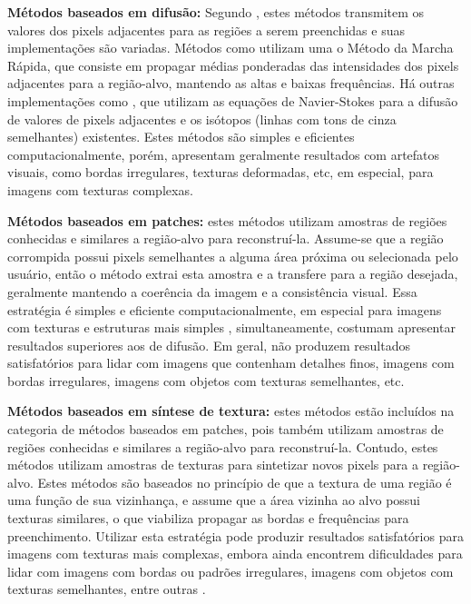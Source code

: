 \begin{list}{}{}

  \item \textbf{Métodos baseados em difusão:} \label{diffusion}
Segundo \cite{black2020evaluation}, estes métodos transmitem os valores dos pixels adjacentes para as regiões a serem preenchidas e suas implementações são variadas. Métodos como \cite{Telea2004} utilizam uma o Método da Marcha Rápida, que consiste em propagar médias ponderadas das intensidades dos pixels adjacentes para a região-alvo, mantendo as altas e baixas frequências. Há outras implementações como \cite{Bertalmio2001navier}, que utilizam as equações de Navier-Stokes para a difusão de valores de pixels adjacentes e os isótopos (linhas com tons de cinza semelhantes) existentes. Estes métodos são simples e eficientes computacionalmente, porém, apresentam geralmente resultados com artefatos visuais, como bordas irregulares, texturas deformadas, etc, em especial, para imagens com texturas complexas.

  \item \textbf{Métodos baseados em patches:} \label{sample}
estes métodos utilizam amostras de regiões conhecidas e similares a região-alvo para reconstruí-la. Assume-se que a região corrompida possui pixels semelhantes a alguma área próxima ou selecionada pelo usuário, então o método extrai esta amostra e a transfere para a região desejada, geralmente mantendo a coerência da imagem e a consistência visual. Essa estratégia é simples e eficiente computacionalmente, em especial para imagens com texturas e estruturas mais simples \cite{patchmatch2009}, simultaneamente, costumam apresentar resultados superiores aos de difusão. Em geral, não produzem resultados satisfatórios para lidar com imagens que contenham detalhes finos, imagens com bordas irregulares, imagens com objetos com texturas semelhantes, etc.

\item \textbf{Métodos baseados em síntese de textura:} \label{texture}
 estes métodos estão incluídos na categoria de métodos baseados em patches, pois também utilizam amostras de regiões conhecidas e similares a região-alvo para reconstruí-la. Contudo, estes métodos utilizam amostras de texturas para sintetizar novos pixels para a região-alvo. Estes métodos são baseados no princípio de que a textura de uma região é uma função de sua vizinhança, e assume que a área vizinha ao alvo possui texturas similares, o que viabiliza propagar as bordas e frequências para preenchimento. Utilizar esta estratégia pode produzir resultados satisfatórios para imagens com texturas mais complexas, embora ainda encontrem dificuldades para lidar com imagens com bordas ou padrões irregulares, imagens com objetos com texturas semelhantes, entre outras \cite{bertalmio2003texture}.
\end{list}


